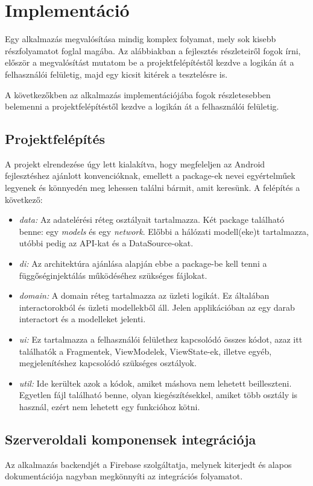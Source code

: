 \chapter{Implementáció}

Egy alkalmazás megvalósítása mindig komplex folyamat, mely sok kisebb részfolyamatot foglal magába. Az alábbiakban a fejlesztés részleteiről fogok írni, először a megvalósítást mutatom be a projektfelépítéstől kezdve a logikán át a felhasználói felületig, majd egy kicsit kitérek a tesztelésre is.

A következőkben az alkalmazás implementációjába fogok részletesebben belemenni a projektfelépítéstől kezdve a logikán át a felhasználói felületig.

\section{Projektfelépítés}
A projekt elrendezése úgy lett kialakítva, hogy megfeleljen az Android fejlesztéshez ajánlott konvencióknak, emellett a package-ek nevei egyértelműek legyenek és könnyedén meg lehessen találni bármit, amit keresünk. A felépítés a következő:
\begin{itemize}
	\item \emph{data:} Az adatelérési réteg osztályait tartalmazza. Két package található benne: egy \emph{models} és egy \emph{network}. Előbbi a hálózati modell(eke)t tartalmazza, utóbbi pedig az API-kat és a DataSource-okat.
	\item \emph{di:} Az architektúra ajánlása alapján ebbe a package-be kell tenni a függőséginjektálás működéséhez szükséges fájlokat.
	\item \emph{domain:} A domain réteg tartalmazza az üzleti logikát. Ez általában interactorokból és üzleti modellekből áll. Jelen applikációban az egy darab interactort és a modelleket jelenti.
	\item \emph{ui:} Ez tartalmazza a felhasználói felülethez kapcsolódó összes kódot, azaz itt találhatók a Fragmentek, ViewModelek, ViewState-ek, illetve egyéb, megjelenítéshez kapcsolódó szükséges osztályok.
	\item \emph{util:} Ide kerültek azok a kódok, amiket máshova nem lehetett beilleszteni. Egyetlen fájl található benne, olyan kiegészítésekkel, amiket több osztály is használ, ezért nem lehetett egy funkcióhoz kötni.
\end{itemize}

\section{Szerveroldali komponensek integrációja}
Az alkalmazás backendjét a Firebase szolgáltatja, melynek kiterjedt és alapos dokumentációja nagyban megkönnyíti az integrációs folyamatot.

